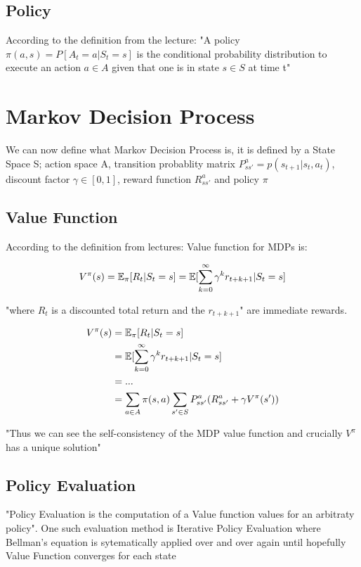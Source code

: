 \subsection{Policy}
According to the definition from the lecture: "A policy $\pi(a, s) = P[A_t = a | S_t = s]$ is the conditional probability distribution to execute an action $a \in A$ given that one is in state $s \in S$ at time t"

\section{Markov Decision Process}
We can now define what Markov Decision Process is, it is defined by a State Space S; action space A, transition probablity matrix $P^{a}_{ss'} = p(s_{t+1}| s_t, a_t)$, discount factor $\gamma \in [0, 1]$, reward function $R^{a}_{ss'}$ and policy $\pi$

\subsection{Value Function}
According to the definition from lectures: Value function for MDPs is:

\begin{align}
    V^{\pi}(s) = \operatorname{\mathbb{E}}_{\pi}[R_{t} | S_t = s] = \operatorname{\mathbb{E}}[\sum^{\infty}_{k=0} \gamma^k r_{t+k+1} | S_t = s]
\end{align}

"where $R_t$ is a discounted total return and the $r_{t+k+1}$" are immediate rewards.

\begin{align}
    V^{\pi}(s) &= \operatorname{\mathbb{E}}_{\pi}[R_{t} | S_t = s] \\ 
    &= \operatorname{\mathbb{E}}[\sum^{\infty}_{k=0} \gamma^k r_{t+k+1} | S_t = s] \\
    &= ... \\
    &= \sum_{a \in A} \pi(s, a) \sum_{s' \in S} P^{a}_{ss'} (R^{a}_{ss'} + \gamma V^{\pi}(s'))
\end{align}

"Thus we can see the self-consistency of the MDP value function and crucially $V^{\pi}$ has a unique solution"

\subsection{Policy Evaluation}
"Policy Evaluation is the computation of a Value function values for an arbitraty policy". One such evaluation method is Iterative Policy Evaluation where Bellman's equation is sytematically applied over and over again until hopefully Value Function converges for each state 

